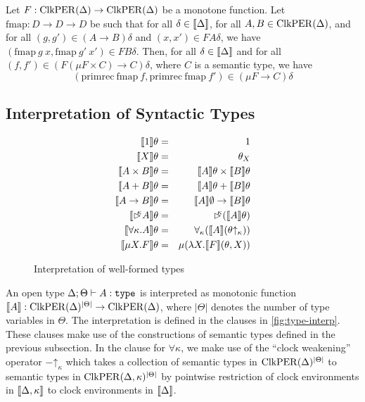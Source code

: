 
\begin{lemma}\label{lem:primrec-well-typed}
  Let $F : \mathrm{ClkPER}(\Delta) \to \mathrm{ClkPER}(\Delta)$ be a monotone
  function.  Let $\mathrm{fmap} : D \to D \to D$ be such that for all
  $\delta \in \llbracket \Delta \rrbracket$, for all $A,B \in \mathrm{ClkPER}(\Delta)$, and
  for all $(g,g') \in (A \to B)\delta$ and $(x,x') \in FA\delta$, we
  have $(\mathrm{fmap}\ g\ x, \mathrm{fmap}\ g'\ x') \in FB\delta$.
  Then, for all $\delta \in \llbracket \Delta \rrbracket$ and for all $(f,f') \in
  (F(\mu F \times C) \to C)\delta$, where $C$ is a semantic type, we
  have
  \begin{displaymath}
    (\mathrm{primrec}\ \mathrm{fmap}\ f, \mathrm{primrec}\ \mathrm{fmap}\ f') \in (\mu F \to C)\delta
  \end{displaymath}
\end{lemma}



\subsection{Interpretation of Syntactic Types}\label{sec:type-interp}

\begin{figure}[t]
  \centering
  \begin{eqnarray*}
    \llbracket 1 \rrbracket\theta & = & 1 \\
    \llbracket X \rrbracket\theta & = & \theta_X \\
    \llbracket A \times B \rrbracket\theta & = & \llbracket A \rrbracket\theta \times \llbracket B \rrbracket\theta \\
    \llbracket A + B \rrbracket\theta & = & \llbracket A \rrbracket\theta + \llbracket B \rrbracket\theta \\
    \llbracket A \to B \rrbracket\theta & = & \llbracket A \rrbracket\emptyset \to \llbracket B \rrbracket\theta \\
    \llbracket \mathord{\rhd\kern-0.4em^{\kappa}} A \rrbracket\theta & = & \mathord{\rhd\kern-0.4em^{\kappa}} (\llbracket A \rrbracket\theta) \\
    \llbracket \forall \kappa. A \rrbracket\theta & = & \forall_\kappa (\llbracket A \rrbracket(\theta\mathord\uparrow_\kappa)) \\
    \llbracket \mu X. F \rrbracket\theta & = & \mu (\lambda X. \llbracket F \rrbracket(\theta, X))
  \end{eqnarray*}
  \caption{Interpretation of well-formed types}
  \label{fig:type-interp}
\end{figure}

An open type $\Delta; \Theta \vdash A : \texttt{\textup{type}}$ is interpreted as
monotonic function $\llbracket A \rrbracket : \mathrm{ClkPER}(\Delta)^{|\Theta|} \to
\mathrm{ClkPER}(\Delta)$, where $|\Theta|$ denotes the number of type
variables in $\Theta$. The interpretation is defined in the clauses in
\autoref{fig:type-interp}. These clauses make use of the constructions
of semantic types defined in the previous subsection. In the clause
for $\forall \kappa$, we make use of the ``clock weakening'' operator
$-\mathord\uparrow_\kappa$ which takes a collection of semantic types
in $\mathrm{ClkPER}(\Delta)^{|\Theta|}$ to semantic types in
$\mathrm{ClkPER}(\Delta,\kappa)^{|\Theta|}$ by pointwise restriction of clock
environments in $\llbracket \Delta, \kappa \rrbracket$ to clock environments in
$\llbracket \Delta \rrbracket$.

